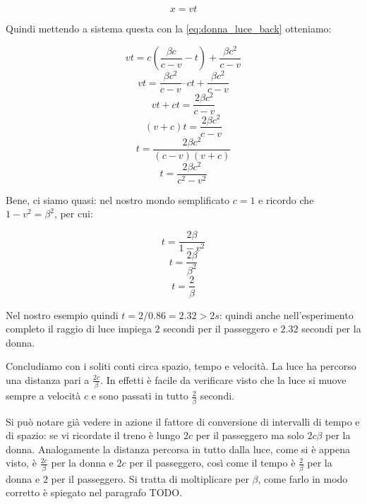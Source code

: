 $$ x=vt $$

Quindi mettendo a sistema questa con la \ref{eq:donna_luce_back} otteniamo:

$$ vt = c(\frac{\beta c}{c-v}-t) + \frac{\beta c^2}{c-v}  $$
$$ vt = \frac{\beta c^2}{c-v} – ct + \frac{\beta c^2}{c-v} $$
$$ vt + ct = \frac{2\beta c^2}{c-v} $$
$$ (v + c)t = \frac{2\beta c^2}{c-v} $$   
$$ t = \frac{2\beta c^2}{(c-v)(v+c)} $$   
$$ t = \frac{2\beta c^2}{c^2-v^2} $$

Bene, ci siamo quasi: nel nostro mondo semplificato $c=1$ e ricordo che $1-v^2=\beta^2$, per cui:

$$ t = \frac{2\beta}{1-v^2} $$
$$ t = \frac{2\beta}{\beta^2} $$
$$ t = \frac{2}{\beta} $$

Nel nostro esempio quindi $t= 2/0.86= 2.32 > 2s$: quindi anche nell'esperimento completo il raggio di luce impiega $2$ secondi per il passeggero e $2.32$ secondi per la donna.

Concludiamo con i soliti conti circa spazio, tempo e velocità. La luce ha percorso una distanza pari a $\frac{2c}{\beta}$. In effetti è facile da verificare visto che la luce si muove sempre a velocità $c$ e sono passati in tutto $\frac{2}{\beta}$ secondi. 

Si può notare già vedere in azione il fattore di conversione di intervalli di tempo e di spazio: se vi ricordate il treno è lungo $2c$ per il passeggero ma solo $2c\beta$ per la donna. Analogamente la distanza percorsa in tutto dalla luce, come si è appena visto, è $\frac{2c}{\beta}$ per la donna e $2c$ per il passeggero, così come il tempo è $\frac{2}{\beta}$ per la donna e $2$ per il passeggero. Si tratta di moltiplicare per $\beta$, come farlo in modo corretto è spiegato nel paragrafo TODO.

  
